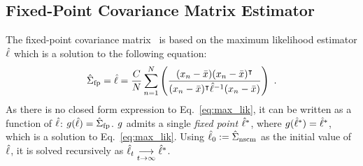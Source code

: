 %

\subsection{Fixed-Point Covariance Matrix Estimator}

The fixed-point covariance matrix~\citep{pascal_theoretical_2005} is based on the maximum likelihood estimator $\hat{\ell}$ which is a solution to the following equation:
\begin{equation}
\label{eq:max_lik}
\cov{fp} = \mle = \frac{\dc}{\dt} \sum_{\si=1}^\dt \left( \frac{(\x_\si - \xb)(\x_\si - \xb)^\intercal }{(\x_\si - \xb)^\intercal  \mle^{-1} (\x_\si - \xb)} \right) \ .
\end{equation}
As there is no closed form expression to Eq.~\eqref{eq:max_lik}, it can be written as a function of $\hat{\ell}$: $g(\hat{\ell}) = \hat{\Sigma}_{\operatorname{fp}}$.
$g$ admits a single \emph{fixed point} $\hat{\ell}^*$, where $g(\hat{\ell}^*) = \hat{\ell}^*$, which is a solution to Eq.~\eqref{eq:max_lik}. 
Using $\hat{\ell}_{0}:=\hat{\Sigma}_{\operatorname{nscm}}$ as the initial value of $\hat{\ell} $, it is solved recursively as $\hat{\ell}_{t} \underset{t \to \infty}{\longrightarrow} \hat{\ell}^{*}$.

